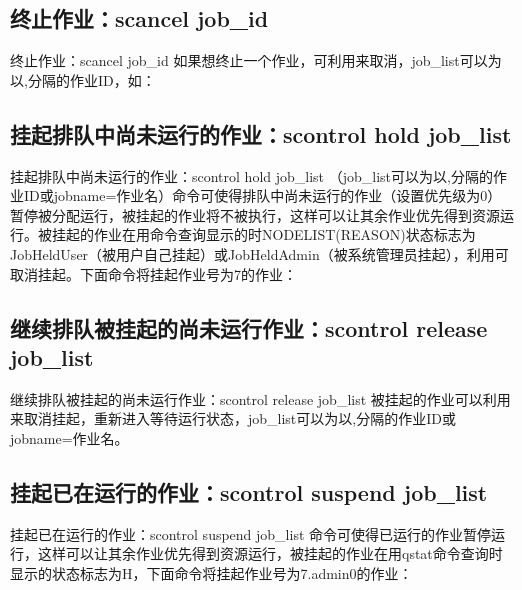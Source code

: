 \subsection{终止作业：scancel job\_id}
\begin{frame}{终止作业：scancel job\_id}
如果想终止一个作业，可利用来取消，job\_list可以为以,分隔的作业ID，如：

\end{frame}

\subsection{挂起排队中尚未运行的作业：scontrol hold job\_list}
\begin{frame}{挂起排队中尚未运行的作业：scontrol hold job\_list}
（job\_list可以为以,分隔的作业ID或jobname=作业名）命令可使得排队中尚未运行的作业（设置优先级为0）暂停被分配运行，被挂起的作业将不被执行，这样可以让其余作业优先得到资源运行。被挂起的作业在用命令查询显示的时NODELIST(REASON)状态标志为JobHeldUser（被用户自己挂起）或JobHeldAdmin（被系统管理员挂起），利用可取消挂起。下面命令将挂起作业号为7的作业：

\end{frame}

\subsection{继续排队被挂起的尚未运行作业：scontrol release job\_list}
\begin{frame}{继续排队被挂起的尚未运行作业：scontrol release job\_list}
被挂起的作业可以利用来取消挂起，重新进入等待运行状态，job\_list可以为以,分隔的作业ID或jobname=作业名。

\end{frame}

\subsection{挂起已在运行的作业：scontrol suspend job\_list}
\begin{frame}{挂起已在运行的作业：scontrol suspend job\_list}
命令可使得已运行的作业暂停运行，这样可以让其余作业优先得到资源运行，被挂起的作业在用qstat命令查询时显示的状态标志为H，下面命令将挂起作业号为7.admin0的作业：

\end{frame}

